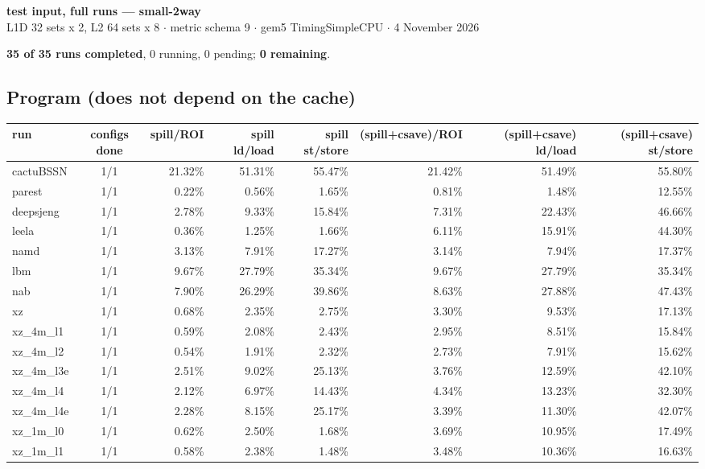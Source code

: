 \documentclass[10pt,a4paper,landscape]{article}
\begin{document}
\begin{center}
{\large\bfseries test input, full runs --- small-2way}\\[3pt]
{\small L1D 32 sets x 2, L2 64 sets x 8 $\cdot$ metric schema 9 $\cdot$ gem5 TimingSimpleCPU $\cdot$ 4 November 2026}
\end{center}
\textbf{35 of 35 runs completed}, 0 running, 0 pending; \textbf{0 remaining}.\par
\subsection*{Program (does not depend on the cache)}
{\footnotesize
\begin{longtable}{lcrrrrrr}
\toprule
run & configs done & spill/ROI & spill ld/load & spill st/store & (spill+csave)/ROI & (spill+csave) ld/load & (spill+csave) st/store \\
\midrule
\endhead
\bottomrule
\endfoot
cactuBSSN & 1/1 & 21.32\% & 51.31\% & 55.47\% & 21.42\% & 51.49\% & 55.80\% \\
parest & 1/1 & 0.22\% & 0.56\% & 1.65\% & 0.81\% & 1.48\% & 12.55\% \\
deepsjeng & 1/1 & 2.78\% & 9.33\% & 15.84\% & 7.31\% & 22.43\% & 46.66\% \\
leela & 1/1 & 0.36\% & 1.25\% & 1.66\% & 6.11\% & 15.91\% & 44.30\% \\
namd & 1/1 & 3.13\% & 7.91\% & 17.27\% & 3.14\% & 7.94\% & 17.37\% \\
lbm & 1/1 & 9.67\% & 27.79\% & 35.34\% & 9.67\% & 27.79\% & 35.34\% \\
nab & 1/1 & 7.90\% & 26.29\% & 39.86\% & 8.63\% & 27.88\% & 47.43\% \\
xz & 1/1 & 0.68\% & 2.35\% & 2.75\% & 3.30\% & 9.53\% & 17.13\% \\
xz\_4m\_l1 & 1/1 & 0.59\% & 2.08\% & 2.43\% & 2.95\% & 8.51\% & 15.84\% \\
xz\_4m\_l2 & 1/1 & 0.54\% & 1.91\% & 2.32\% & 2.73\% & 7.91\% & 15.62\% \\
xz\_4m\_l3e & 1/1 & 2.51\% & 9.02\% & 25.13\% & 3.76\% & 12.59\% & 42.10\% \\
xz\_4m\_l4 & 1/1 & 2.12\% & 6.97\% & 14.43\% & 4.34\% & 13.23\% & 32.30\% \\
xz\_4m\_l4e & 1/1 & 2.28\% & 8.15\% & 25.17\% & 3.39\% & 11.30\% & 42.07\% \\
xz\_1m\_l0 & 1/1 & 0.62\% & 2.50\% & 1.68\% & 3.69\% & 10.95\% & 17.49\% \\
xz\_1m\_l1 & 1/1 & 0.58\% & 2.38\% & 1.48\% & 3.48\% & 10.36\% & 16.63\% \\

\end{longtable}}
\end{document}

